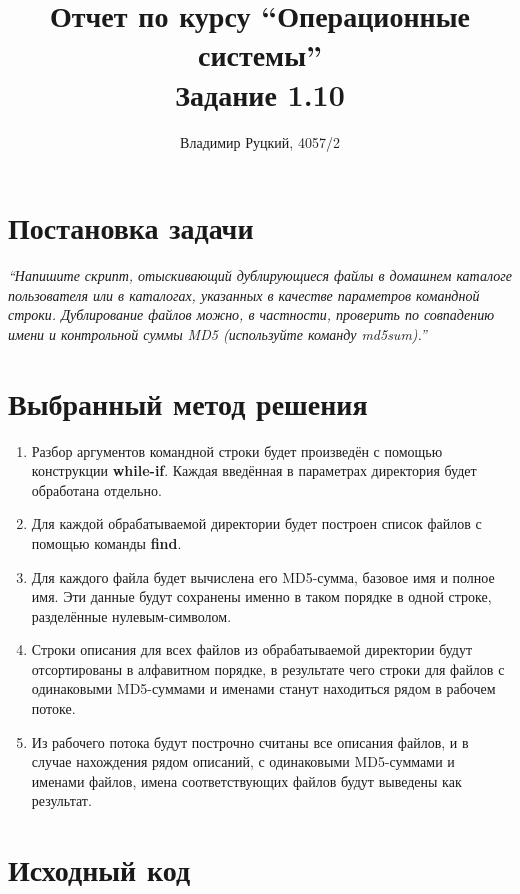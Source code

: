 \documentclass[a4paper,12pt]{article}
\title{Отчет по курсу ``Операционные системы'' \\ Задание 1.10}
\author{Владимир Руцкий, 4057/2}
\newcommand{\commandquote}[1]{\textbf{#1}}
\begin{document}
\maketitle

\section*{Постановка задачи}
\textit{``Напишите скрипт, отыскивающий дублирующиеся файлы в домашнем каталоге
пользователя или в каталогах, указанных в качестве параметров командной
строки. Дублирование файлов можно, в частности, проверить по совпадению
имени и контрольной суммы MD5 (используйте команду md5sum).''}

\section*{Выбранный метод решения}
\begin{enumerate}
 \item Разбор аргументов командной строки будет произведён с помощью конструкции \commandquote{while-if}.
Каждая введённая в параметрах директория будет обработана отдельно.
 \item Для каждой обрабатываемой директории будет построен список файлов с помощью команды \commandquote{find}.
 \item Для каждого файла будет вычислена его MD5-сумма, базовое имя и полное имя. 
Эти данные будут сохранены именно в таком порядке в одной строке, разделённые нулевым-символом.
 \item Строки описания для всех файлов из обрабатываемой директории будут отсортированы в алфавитном порядке, 
в результате чего строки для файлов с одинаковыми MD5-суммами и именами станут находиться рядом
в рабочем потоке.
 \item Из рабочего потока будут построчно считаны все описания файлов, и в случае нахождения рядом описаний,
с одинаковыми MD5-суммами и именами файлов, имена соответствующих файлов будут выведены как результат.
\end{enumerate}

\pagebreak
\section*{Исходный код}
\lstset{language=bash, caption=task\_1\_10.sh,%
label=source-code, basicstyle=\footnotesize,%
numbers=left, numberstyle=\footnotesize, numbersep=5pt, frame=single, breaklines=true, breakatwhitespace=false,%
inputencoding=utf8x}

\end{document}
